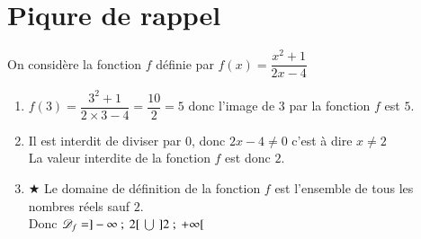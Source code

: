 \documentclass[oneside,12pt]{exam}          %
\begin{document}
\section{Piqure de rappel}
On considère la fonction $f$ définie par $f(x) = \dfrac{x^2 + 1}{2x - 4}$
\begin{enumerate}
	\item $f(3) = \dfrac{3^2 + 1}{2 \times 3 - 4} = \dfrac{10}{2} = 5$ \quad donc l'image de $3$ par la fonction $f$ est $5$.
	\item Il est interdit de diviser par $0$, donc $2x - 4 \neq 0$ c'est à dire $x \neq 2$ \\
	La valeur interdite de la fonction $f$ est donc $2$.
	\item $\bigstar$ Le domaine de définition de la fonction $f$ est l'ensemble de tous les nombres réels sauf $2$. \\
	Donc ${\mathscr{D}}_f = ]-\infty ~;~ 2[ \,\,\bigcup\,\, ]2 ~;~ +\infty[$
\end{enumerate}
\end{document}
